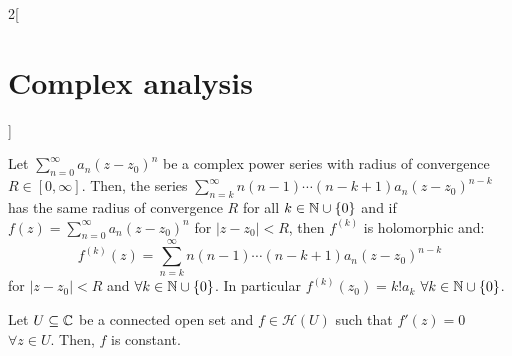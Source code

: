 \documentclass[../../../main.tex]{subfiles}
\begin{document}
\begin{multicols}{2}[\section{Complex analysis}]
\begin{theorem}
  \end{theorem}
  \begin{corollary}
    Let $\sum_{n=0}^\infty a_n{(z-z_0)}^n$ be a complex power series with radius of convergence $R\in[0,\infty]$. Then, the series $\sum_{n=k}^\infty n(n-1)\cdots(n-k+1)a_n{(z-z_0)}^{n-k}$ has the same radius of convergence $R$ for all $k\in\mathbb{N} \cup\{0\}$ and if $f(z)=\sum_{n=0}^\infty a_n{(z-z_0)}^n$ for $|z-z_0|<R$, then $f^{(k)}$ is holomorphic and: $$f^{(k)}(z)=\sum_{n=k}^\infty n(n-1)\cdots(n-k+1)a_n{(z-z_0)}^{n-k}$$ for $|z-z_0|<R$ and $\forall k\in\mathbb{N} \cup\{0\}$. In particular $f^{(k)}(z_0)=k!a_k$ $\forall k\in\mathbb{N}\cup\{0\}$.
  \end{corollary}
  \begin{proposition}
    Let $U\subseteq\mathbb{C}$ be a connected open set and $f\in\mathcal{H}(U)$ such that $f'(z)=0$ $\forall z\in U$. Then, $f$ is constant.
  \end{proposition}

\end{multicols}
\end{document}
